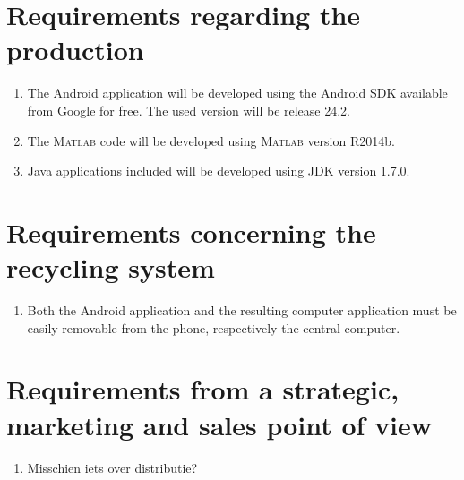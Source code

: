 \documentclass[a4paper]{article}
\newcommand{\matlab}{\textsc{Matlab} } %
\begin{document}
\section{Requirements regarding the production}
\begin{enumerate}
\item The Android application will be developed using the Android SDK available from Google for free. The used version will be release 24.2.
\item The \matlab code will be developed using \matlab version R2014b. 
\item Java applications included will be developed using JDK version 1.7.0.
\end{enumerate}

\section{Requirements concerning the recycling system}
\begin{enumerate}
\item Both the Android application and the resulting computer application must be easily removable from the phone, respectively the central computer.
\end{enumerate}

\section{Requirements from a strategic, marketing and sales point of view}
\begin{enumerate}
\item Misschien iets over distributie?
\end{enumerate}
\newpage
{}
\label{sec:bibliography}

\end{document}
